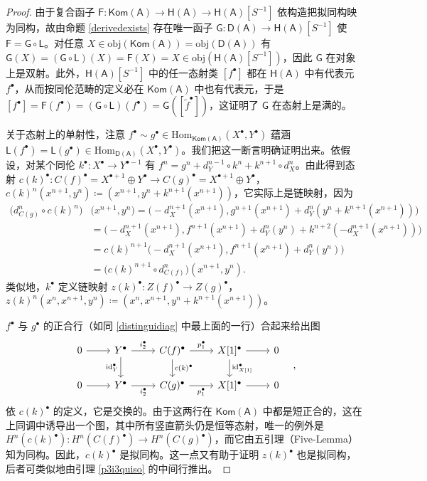 \begin{proof}
	由于复合函子 $\mathsf{F}:\mathsf{Kom(A)}\rightarrow\mathsf{H(A)}\rightarrow\mathsf{H(A)}[S^{-1}]$ 依构造把拟同构映为同构，故由命题 \ref{derivedexists} 存在唯一函子 $\mathsf{G}:\mathsf{D(A)}\rightarrow\mathsf{H(A)}[S^{-1}]$ 使 $\mathsf{F}=\mathsf{G}\circ\mathsf{L}$。对任意 $X\in\text{obj}(\mathsf{Kom(A)})=\text{obj}(\mathsf{D(A)})$ 有 $\mathsf{G}(X)=(\mathsf{G}\circ\mathsf{L})(X)=\mathsf{F}(X)=X\in\text{obj}(\mathsf{H(A)}[S^{-1}])$，因此 $\mathsf{G}$ 在对象上是双射。此外，$\mathsf{H(A)}[S^{-1}]$ 中的任一态射类 $[f^\bullet]$ 都在 $\mathsf{H(A)}$ 中有代表元 $f^\bullet$，从而按同伦范畴的定义必在 $\mathsf{Kom(A)}$ 中也有代表元，于是 $[f^\bullet]=\mathsf{F}(f^\bullet)=(\mathsf{G}\circ\mathsf{L})(f^\bullet)=\mathsf{G}([\tilde{f}^\bullet])$，这证明了 $\mathsf{G}$ 在态射上是满的。
	
	关于态射上的单射性，注意 $f^\bullet\sim g^\bullet\in\text{Hom}_{\mathsf{Kom(A)}}(X^\bullet, Y^\bullet)$ 蕴涵 $\mathsf{L}(f^\bullet)=\mathsf{L}(g^\bullet)\in\text{Hom}_{\mathsf{D(A)}}(X^\bullet, Y^\bullet)$。我们把这一断言明确证明出来。依假设，对某个同伦 $k^\bullet:X^\bullet\rightarrow Y^{\bullet-1}$ 有 $f^n=g^n+d_Y^{n-1}\circ k^n + k^{n+1}\circ d_X^n$。由此得到态射 $c(k)^\bullet:C(f)^\bullet=X^{\bullet+1}\oplus Y^\bullet\rightarrow C(g)^\bullet=X^{\bullet+1}\oplus Y^\bullet$，$c(k)^n(x^{n+1},y^n)\coloneqq(x^{n+1},y^n+k^{n+1}(x^{n+1}))$，它实际上是链映射，因为 
	\begin{align*}
		\big(d_{C(g)}^n\!\circ c(k)^n)&(x^{n+1},y^n\big)\!=\!\big(\!-d_X^{n+1}(x^{n+1}),g^{n+1}(x^{n+1})+d_Y^n(y^n+k^{n+1}(x^{n+1}))\big)\\
		&=\big(-d_X^{n+1}(x^{n+1}), f^{n+1}(x^{n+1})+d_Y^n(y^n)+k^{n+2}(-d_X^{n+1}(x^{n+1}))\big)\\
		&= c(k)^{n+1}\big(-d_X^{n+1}(x^{n+1}),f^{n+1}(x^{n+1})+d_Y^n(y^n)\big)\\
		&=\big(c(k)^{n+1}\circ d_{C(f)}^n\big)(x^{n+1},y^n).
	\end{align*}
	类似地，$k^\bullet$ 定义链映射 $z(k)^\bullet:Z(f)^\bullet\rightarrow Z(g)^\bullet$，$z(k)^n(x^n,x^{n+1},y^n)\coloneqq (x^n,x^{n+1},y^n+k^{n+1}(x^{n+1}))$。
	
	$f^\bullet$ 与 $g^\bullet$ 的正合行（如同 \eqref{distinguidiag} 中最上面的一行）合起来给出图
	\begin{equation*}
		\begin{tikzcd}
			0\arrow[r] & Y^\bullet\arrow[r,"i_2^\bullet"]\arrow[d,"\text{id}_Y^\bullet"'] & C(f)^\bullet\arrow[r,"p_1^\bullet"]\arrow[d,"c(k)^\bullet"] & X[1]^\bullet\arrow[r]\arrow[d,"\text{id}_{X[1]}^\bullet"] & 0 \\
			0\arrow[r] & Y^\bullet\arrow[r,"i_2^\bullet"'] & C(g)^\bullet\arrow[r,"p_1^\bullet"'] & X[1]^\bullet\arrow[r] & 0
		\end{tikzcd}\quad,
	\end{equation*}
	依 $c(k)^\bullet$ 的定义，它是交换的。由于这两行在 $\mathsf{Kom(A)}$ 中都是短正合的，这在上同调中诱导出一个图，其中所有竖直箭头仍是恒等态射，唯一的例外是 $H^n(c(k)^\bullet):H^n(C(f)^\bullet)\rightarrow H^n(C(g)^\bullet)$，而它由五引理（Five-Lemma）知为同构。因此，$c(k)^\bullet$ 是拟同构。这一点又有助于证明 $z(k)^\bullet$ 也是拟同构，后者可类似地由引理 \ref{p3i3quiso} 的中间行推出。
	

\end{proof}
